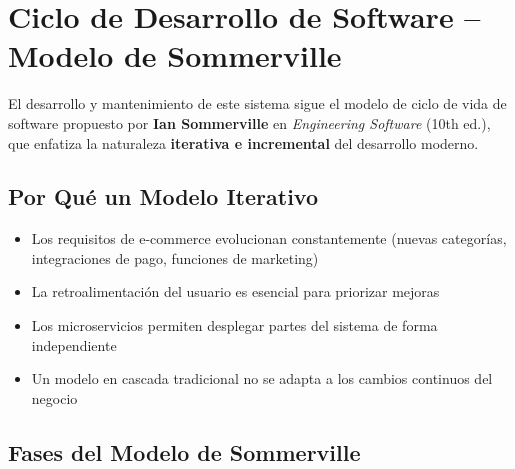 \documentclass[11pt,a4paper]{article}
\begin{document}
\section{Ciclo de Desarrollo de Software -- Modelo de Sommerville}

El desarrollo y mantenimiento de este sistema sigue el modelo de ciclo de vida de software propuesto por \textbf{Ian Sommerville} en \textit{Engineering Software} (10th ed.), que enfatiza la naturaleza \textbf{iterativa e incremental} del desarrollo moderno.

\subsection{Por Qué un Modelo Iterativo}

\begin{itemize}
    \item Los requisitos de e-commerce evolucionan constantemente (nuevas categorías, integraciones de pago, funciones de marketing)
    \item La retroalimentación del usuario es esencial para priorizar mejoras
    \item Los microservicios permiten desplegar partes del sistema de forma independiente
    \item Un modelo en cascada tradicional no se adapta a los cambios continuos del negocio
\end{itemize}

\subsection{Fases del Modelo de Sommerville}
\end{document}
